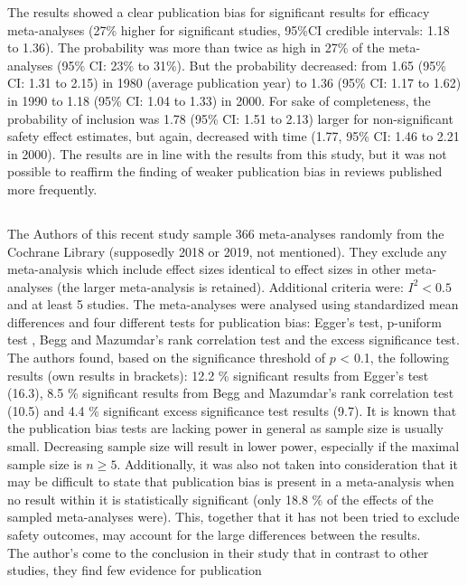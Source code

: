 \documentclass[11pt,a4paper,twoside]{book}\usepackage[]{graphicx}\usepackage[]{color}
\begin{document}
The results showed a clear publication bias for significant results for efficacy meta-analyses (27\% higher for significant studies, 95\%CI credible intervals: 1.18 to 1.36). The probability was more than twice as high in 27\% of the meta-analyses (95\% CI: 23\% to 31\%). But the probability decreased: from 1.65 (95\% CI: 1.31 to 2.15) in 1980 (average publication year) to 1.36 (95\% CI: 1.17 to 1.62) in 1990 to 1.18 (95\% CI: 1.04 to 1.33) in 2000. For sake of completeness, the probability of inclusion was  1.78 (95\% CI: 1.51 to 2.13) larger for non-significant safety effect estimates, but again, decreased with time (1.77, 95\% CI: 1.46 to 2.21 in 2000). The results are in line with the results from this study, but it was not possible to reaffirm the finding of weaker publication bias in reviews published more frequently.\\

\subsection{\citealp{vanAert.2019}}
The Authors of this recent study sample 366 meta-analyses randomly from the Cochrane Library (supposedly 2018 or 2019, not mentioned). They exclude any meta-analysis which include effect sizes identical to effect sizes in other meta-analyses (the larger meta-analysis is retained). Additional criteria were: $I^2 < 0.5$ and at least 5 studies. The meta-analyses were analysed using standardized mean differences and four different tests for publication bias: Egger's test, p-uniform test \citep{p.uniform}, Begg and Mazumdar's rank correlation test and the excess significance test. \\
The authors found, based on the significance threshold of $p$ < 0.1, the following results (own results in brackets):
12.2 \% significant results from Egger's test (16.3),
8.5 \% significant results from Begg and Mazumdar's rank correlation test (10.5) and
4.4 \% significant excess significance test results (9.7).
It is known that the publication bias tests are lacking power in general as sample size is usually small. Decreasing sample size will result in lower power, especially if the maximal sample size is $n \geq 5$. Additionally, it was also not taken into consideration that it may be difficult to state that publication bias is present in a meta-analysis when no result within it is statistically significant (only 18.8 \% of the effects of the sampled meta-analyses were). This, together that it has not been tried to exclude safety outcomes, may account for the large differences between the results. \\
The author's come to the conclusion in their study that in contrast to other studies, they find few evidence for publication
\end{document}
